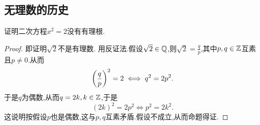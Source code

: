 \subsection{无理数的历史}

\begin{example}
    证明二次方程$x^2=2$没有有理根.
    \begin{proof}
        即证明$\sqrt{2}$不是有理数.
        用反证法.假设$\sqrt{2}\in\mathbb{Q}$,则$\sqrt{2}=\frac{q}{p}$,其中$p,q\in\mathbb{Z}$互素且$p\ne 0$.从而
        \[\left(\frac{q}{p}\right)^2=2\iff q^2=2p^2.\]
        于是$q$为偶数,从而$q=2k,k\in\mathbb{Z}$,于是
        \[(2k)^2=2p^2\iff p^2=2k^2.\]
        这说明按假设$p$也是偶数,这与$p,q$互素矛盾.假设不成立,从而命题得证.
    \end{proof}
\end{example}